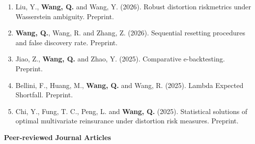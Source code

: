 \documentclass[10pt]{article}
\begin{document}
\begin{enumerate}
  \item Liu, Y., \textbf{Wang, Q.} and Wang, Y. (2026). Robust distortion riskmetrics under Wasserstein ambiguity. Preprint.
  \item \textbf{Wang, Q.}, Wang, R. and Zhang, Z. (2026). Sequential resetting procedures and false discovery rate. Preprint.
  \item Jiao, Z., \textbf{Wang, Q.} and Zhao, Y. (2025). Comparative e-backtesting. Preprint.
  \item Bellini, F., Huang, M., \textbf{Wang, Q.} and Wang, R. (2025). Lambda Expected Shortfall. Preprint.
  \item Chi, Y., Fung, T. C., Peng, L. and \textbf{Wang, Q.} (2025). Statistical solutions of optimal multivariate reinsurance under distortion risk measures. Preprint.
\end{enumerate}

{\bf Peer-reviewed Journal Articles}
\end{document}
